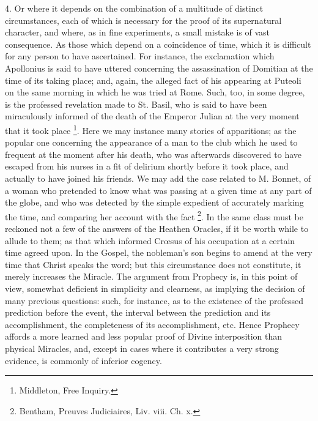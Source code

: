 4. Or where it depends on the combination of a
multitude of distinct circumstances, each of which is necessary for
the proof of its supernatural character, and where, as in fine
experiments, a small mistake is of vast consequence. As those which
depend on a coincidence of time, which it is difficult for any person
to have ascertained. For instance, the exclamation which Apollonius is
said to have uttered concerning the assassination of Domitian at the
time of its taking place; and, again, the alleged fact of his
appearing at Puteoli on the same morning in which he was tried at
Rome. Such, too, in some degree, is the professed revelation made to
St. Basil, who is said to have been miraculously informed of the death
of the Emperor Julian at the very moment that it took place \footnote{Middleton, Free Inquiry.}. Here we may instance many stories of apparitions; as the
popular one concerning the appearance of a man to the club which he
used to frequent at the moment after his death, who was afterwards
discovered to have escaped from his nurses in a fit of delirium
shortly before it took place, and actually to have joined his friends.
We may add the case related to M. Bonnet, of a woman who pretended to
know what was passing at a given time at any part of the globe,
and who was detected by the simple expedient of accurately marking the
time, and comparing her account with the fact \footnote{Bentham, Preuves Judiciaires, Liv. viii. Ch. x.}. In the same class must be reckoned not a few of the answers
of the Heathen Oracles, if it be worth while to allude to them; as
that which informed Crœsus of his occupation at a certain time agreed
upon. In the Gospel, the nobleman's son begins to amend at the very
time that Christ speaks the word; but this circumstance does not
constitute, it merely increases the Miracle. The argument from
Prophecy is, in this point of view, somewhat deficient in simplicity
and clearness, as implying the decision of many previous questions:
such, for instance, as to the existence of the professed prediction
before the event, the interval between the prediction and its
accomplishment, the completeness of its accomplishment, etc. Hence
Prophecy affords a more learned and less popular proof of Divine
interposition than physical Miracles, and, except in cases where it
contributes a very strong evidence, is commonly of inferior cogency.


